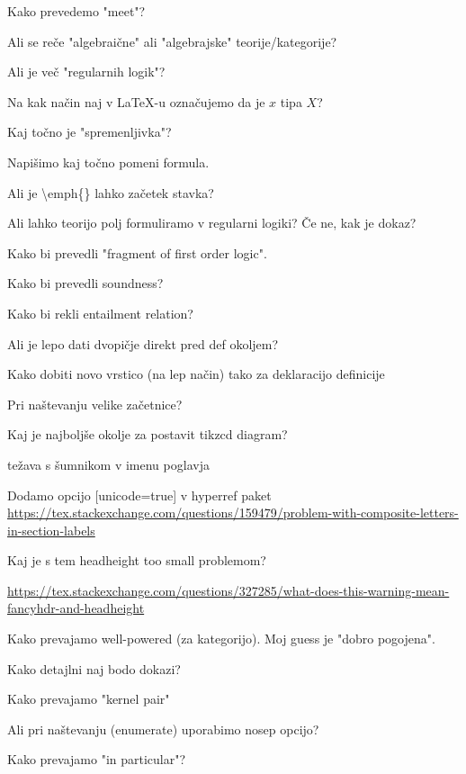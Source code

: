 \documentclass[12pt,a4paper]{article}
\newcommand\ans{\item[\textbf{A:}]}
\begin{document}
    \begin{vprasanja}
        \item Kako prevedemo "meet"?
        \ans
        \item Ali se reče "algebraične" ali "algebrajske" teorije/kategorije?
        \ans
        \item  Ali je več "regularnih logik"?
        \ans
        \item  Na kak način naj v \LaTeX -u označujemo da je $x$ tipa $X$?
        \ans
        \item  Kaj točno je "spremenljivka"?
        \ans
        \item  Napišimo kaj točno pomeni formula.
        \ans
        \item  Ali je \textbackslash emph\{\textasteriskcentered \} lahko začetek stavka?
        \ans
        \item  Ali lahko teorijo polj formuliramo v regularni logiki? Če ne, kak je dokaz?
        \ans
        \item  Kako bi prevedli "fragment of first order logic".
        \ans
        \item  Kako bi prevedli soundness?
        \ans
        \item  Kako bi rekli entailment relation?
        \ans
        \item Ali je lepo dati dvopičje direkt pred def okoljem?
        \ans
        \item Kako dobiti novo vrstico (na lep način) tako za deklaracijo definicije
        \ans 
        \item Pri naštevanju velike začetnice?
        \ans
        \item Kaj je najboljše okolje za postavit tikzcd diagram?
        \ans
        \item težava s šumnikom v imenu poglavja
        \ans Dodamo opcijo [unicode=true] v hyperref paket
        \url{https://tex.stackexchange.com/questions/159479/problem-with-composite-letters-in-section-labels}
        \item Kaj je s tem headheight too small problemom?
        \ans \url{https://tex.stackexchange.com/questions/327285/what-does-this-warning-mean-fancyhdr-and-headheight}
        \item Kako prevajamo well-powered (za kategorijo). Moj guess je "dobro pogojena".
        \ans
        \item Kako detajlni naj bodo dokazi?
        \ans
        \item Kako prevajamo "kernel pair"
        \ans
        \item Ali pri naštevanju (enumerate) uporabimo nosep opcijo?
        \ans
        \item Kako prevajamo "in particular"?
        \ans
    \end{vprasanja}
\end{document}
